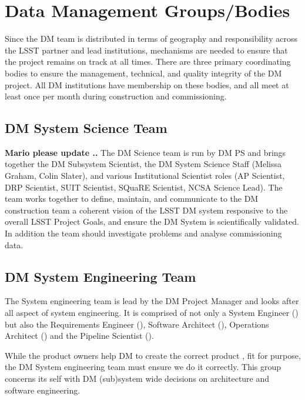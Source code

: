\section{Data Management Groups/Bodies} \label{sect:groups}
Since the DM team is distributed in terms of geography and responsibility across the LSST partner and lead institutions, mechanisms are needed to ensure that the project remains on track at all times.  There are three primary coordinating bodies to ensure the management, technical, and quality integrity of the DM project.  All DM institutions have membership on these bodies, and all meet at least once per month during construction and commissioning.

\subsection{DM System Science Team \label{sect:dmsst}}
{\bf Mario  please update ..}
The DM Science team is run by DM PS and brings together the DM Subsystem Scientist, the DM System Science Staff (Melissa Graham, Colin Slater), and various Institutional Scientist roles (AP Scientist, DRP Scientist, SUIT Scientist, SQuaRE Scientist, NCSA Science Lead). 
The team works together to define, maintain, and communicate to the DM construction team a coherent vision of the LSST DM system responsive to the overall LSST Project Goals, and ensure the DM System is scientifically validated. In addition the team should  investigate problems and analyse commissioning data. 

\subsection{DM System Engineering Team \label{sect:sysengt}}
The System engineering team is lead by the DM Project Manager and looks after all aspect of system engineering. It is comprised of not only a System Engineer () but also the Requirements Engineer (), Software Architect (), Operations Architect () and the Pipeline Scientist ().

While the product owners help DM to create the correct product , fit for purpose, the DM System engineering team must ensure we do it correctly. This group concerns its self with DM (sub)system wide decisions on architecture and software engineering.  

